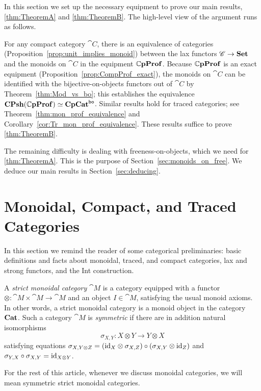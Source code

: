 \documentclass[11pt,oneside,article]{memoir}
\begin{document}
In this section we set up the necessary equipment to prove our main results, \ref{thm:TheoremA} and
\ref{thm:TheoremB}. The high-level view of the argument runs as follows.

For any compact category $\cat{C}$, there is an equivalence
of categories (Proposition~\ref{prop:unit_implies_monoid}) between the lax functors $\mathscr{C}\to\mathbf{Set}$
and the monoids on $\cat{C}$ in the equipment $\mathbb{C}\mathbf{pProf}$. Because
$\mathbb{C}\mathbf{pProf}$ is an exact equipment (Proposition~\ref{prop:CompProf_exact}), the monoids on $\cat{C}$
can be identified with the bijective-on-objects functors out of $\cat{C}$ by
Theorem~\ref{thm:Mod_vs_bo}; this establishes the equivalence
$\mathbf{CPsh}(\mathbb{C}\mathbf{pProf})\simeq\mathbf{CpCat}^{\mathsf{bo}}$. Similar results hold for traced categories; see
Theorem~\ref{thm:mon_prof_equivalence} and Corollary~\ref{cor:Tr_mon_prof_equivalence}. These
results suffice to prove \ref{thm:TheoremB}.

The remaining difficulty is dealing with freeness-on-objects, which we need for \ref{thm:TheoremA}.
This is the purpose of Section~\ref{sec:monoids_on_free}. We deduce our main results in
Section~\ref{sec:deducing}.

\section{Monoidal, Compact, and Traced Categories}
   \label{sec:monoidal,compact,traced}
In this section we remind the reader of some categorical preliminaries: basic definitions and facts about monoidal, traced, and compact categories, lax and strong functors, and the Int construction.

A \emph{strict monoidal category} $\cat{M}$ is a category equipped with a functor
$\otimes\colon\cat{M}\times\cat{M}\to\cat{M}$ and an object $I\in\cat{M}$, satisfying the usual
monoid axioms. In other words, a strict monoidal category is a monoid object in the category $\mathbf{Cat}$.
Such a category $\cat{M}$ is \emph{symmetric} if there are in addition natural
isomorphisms
\[
   \sigma_{X,Y}\colon X\otimes Y\to Y\otimes X
\]
satisfying equations $\sigma_{X,Y\otimes Z}=(\mathrm{id}_X\otimes\sigma_{X,Z})\circ(\sigma_{X,Y}\otimes
\mathrm{id}_Z)$ and $\sigma_{Y,X}\circ\sigma_{X,Y}=\mathrm{id}_{X\otimes Y}$.
\begin{warning}
      \label{warn:symmetric}
   For the rest of this article, whenever we discuss monoidal categories, we will mean symmetric
   strict monoidal categories.
\end{warning}
\end{document}
